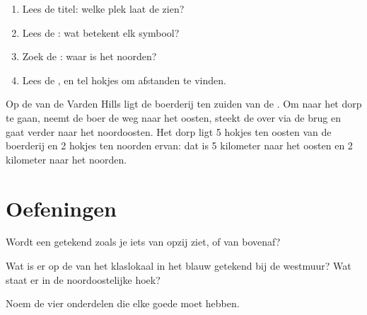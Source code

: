 
\begin{method}\label{met:g2:drawing-to-map:read}
\begin{enumerate}
  \item Lees de titel: welke plek laat de  zien?
  \item Lees de : wat betekent elk symbool?
  \item Zoek de : waar is het noorden?
  \item Lees de , en tel hokjes om afstanden te vinden.
\end{enumerate}
\end{method}

\begin{example}\label{ex:g2:drawing-to-map:farm}
Op de  van de Varden Hills ligt de boerderij ten zuiden van de .
Om naar het dorp te gaan, neemt de boer de weg naar het oosten, steekt de
 over via de brug en gaat verder naar het noordoosten. Het dorp ligt
5 hokjes ten oosten van de boerderij en 2 hokjes ten noorden ervan: dat is
5 kilometer naar het oosten en 2 kilometer naar het noorden.
\end{example}

\section{Oefeningen}

\begin{exercise}[$\star$]\label{exo:g2:drawing-to-map:1}
Wordt een  getekend zoals je iets van opzij ziet, of van bovenaf?
\end{exercise}

\begin{exercise}[$\star$]\label{exo:g2:drawing-to-map:2}
Wat is er op de  van het klaslokaal in het blauw getekend bij de
westmuur? Wat staat er in de noordoostelijke hoek?
\end{exercise}

\begin{exercise}[$\star$]\label{exo:g2:drawing-to-map:3}
Noem de vier onderdelen die elke goede  moet hebben.
\end{exercise}

